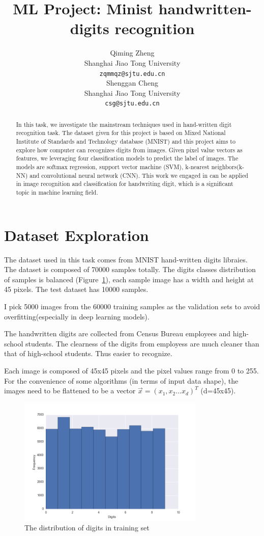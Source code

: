 \documentclass{article}
\title{ML Project: Minist handwritten-digits recognition}
\author{
  	Qiming Zheng \\
	Shanghai Jiao Tong University\\
	\texttt {zqmmqz@sjtu.edu.cn}\\
	\And
	Shenggan Cheng \\
 	Shanghai Jiao Tong University\\
      \texttt {csg@sjtu.edu.cn}\\
}
\begin{document}

\maketitle

\begin{abstract}

In this task, we investigate the mainstream techniques used in hand-written digit recognition task.
The dataset given for this project is based on Mixed National Institute of Standards and Technology database (MNIST) and this project aims to explore how computer can recognizes digits from images. Given pixel value vectors as features, we leveraging four classification models to predict the label of images. The models are softmax regression, support vector machine (SVM), k-nearest neighbors(k-NN) and convolutional neural network (CNN). This work we engaged in can be applied in image recognition and classification for handwriting digit, which is a significant topic in machine learning field.

\end{abstract}

\section{Dataset Exploration}


The dataset used in this task comes from MNIST hand-written digits libraies. The dataset is composed of 70000 samples totally. The digits classes distribution of samples is balanced (Figure~\ref{data_dist}), each sample image has a width and height at 45 pixels. The test dataset has 10000 samples.

I pick 5000 images from the 60000 training samples as the validation sets to avoid overfitting(especially in deep learning models).

The handwritten digits are collected from  Census Bureau employees and  high-school students. The clearness of the digits from employess are much cleaner than that of high-school students. Thus easier to recognize.

Each image is composed of 45x45 pixels and the pixel values range from 0 to 255. For the convenience of some algorithms (in terms of input data shape), the images need to be flattened to be a vector $\vec x = (x_1,x_2...x_d)^T$ (d=45x45). 

\begin{figure}[!h]
\centering
\includegraphics[width=3.5in]{image/train_data_dist}
\caption{The distribution of digits in training set}
\label{data_dist}
\end{figure}
\end{document}
